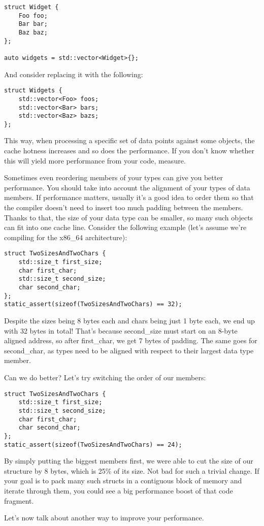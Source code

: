 \begin{lstlisting}[style=styleCXX]
struct Widget {
	Foo foo;
	Bar bar;
	Baz baz;
};

auto widgets = std::vector<Widget>{};
\end{lstlisting}

And consider replacing it with the following:

\begin{lstlisting}[style=styleCXX]
struct Widgets {
	std::vector<Foo> foos;
	std::vector<Bar> bars;
	std::vector<Baz> bazs;
};
\end{lstlisting}

This way, when processing a specific set of data points against some objects, the cache hotness increases and so does the performance. If you don't know whether this will yield more performance from your code, measure.

Sometimes even reordering members of your types can give you better performance. You should take into account the alignment of your types of data members. If performance matters, usually it's a good idea to order them so that the compiler doesn't need to insert too much padding between the members. Thanks to that, the size of your data type can be smaller, so many such objects can fit into one cache line. Consider the following example (let's assume we're compiling for the x86\_64 architecture):

\begin{lstlisting}[style=styleCXX]
struct TwoSizesAndTwoChars {
	std::size_t first_size;
	char first_char;
	std::size_t second_size;
	char second_char;
};
static_assert(sizeof(TwoSizesAndTwoChars) == 32);
\end{lstlisting}

Despite the sizes being 8 bytes each and chars being just 1 byte each, we end up with 32 bytes in total! That's because second\_size must start on an 8-byte aligned address, so after first\_char, we get 7 bytes of padding. The same goes for second\_char, as types need to be aligned with respect to their largest data type member.

Can we do better? Let's try switching the order of our members:

\begin{lstlisting}[style=styleCXX]
struct TwoSizesAndTwoChars {
	std::size_t first_size;
	std::size_t second_size;
	char first_char;
	char second_char;
};
static_assert(sizeof(TwoSizesAndTwoChars) == 24);
\end{lstlisting}

By simply putting the biggest members first, we were able to cut the size of our structure by 8 bytes, which is 25\% of its size. Not bad for such a trivial change. If your goal is to pack many such structs in a contiguous block of memory and iterate through them, you could see a big performance boost of that code fragment.

Let's now talk about another way to improve your  performance.














